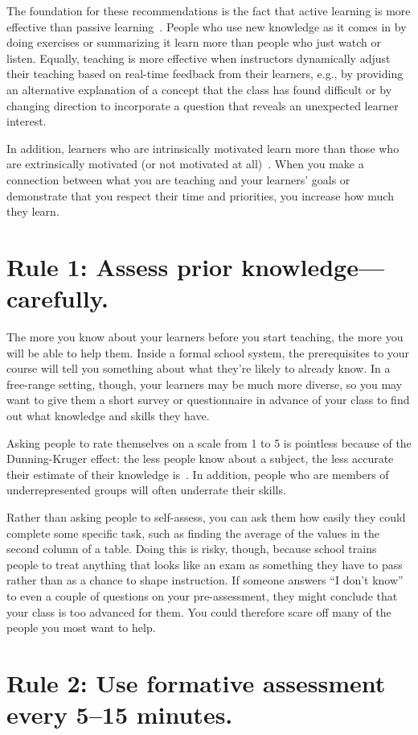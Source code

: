 \documentclass[10pt,letterpaper]{article}
\newcommand{\rulemajor}[1]{\section{#1}}
\begin{document}
The foundation for these recommendations is the fact that
active learning is more effective than passive learning~\cite{Ambr2010,HPL2}.
People who use new knowledge as it comes in by doing exercises or summarizing it
learn more than people who just watch or listen.
Equally,
teaching is more effective when instructors dynamically adjust their teaching
based on real-time feedback from their learners,
e.g.,
by providing an alternative explanation of a concept that the class has found difficult
or by changing direction to incorporate a question that reveals an unexpected learner interest.

In addition,
learners who are intrinsically motivated learn more than those who are extrinsically motivated
(or not motivated at all)~\cite{Wlod2017}.
When you make a connection between what you are teaching and your learners' goals
or demonstrate that you respect their time and priorities,
you increase how much they learn.

\rulemajor{Rule 1: Assess prior knowledge---carefully.}

The more you know about your learners before you start teaching,
the more you will be able to help them.
Inside a formal school system,
the prerequisites to your course will tell you something about
what they're likely to already know.
In a free-range setting,
though,
your learners may be much more diverse,
so you may want to give them a short survey or questionnaire in advance of your class
to find out what knowledge and skills they have.

Asking people to rate themselves on a scale from 1 to 5 is pointless
because of the Dunning-Kruger effect:
the less people know about a subject,
the less accurate their estimate of their knowledge is~\cite{Krug1999}.
In addition,
people who are members of underrepresented groups will often underrate their skills.

Rather than asking people to self-assess,
you can ask them how easily they could complete some specific task,
such as finding the average of the values in the second column of a table.
Doing this is risky,
though,
because school trains people
to treat anything that looks like an exam as something they have to pass
rather than as a chance to shape instruction.
If someone answers ``I don't know'' to even a couple of questions on your pre-assessment,
they might conclude that your class is too advanced for them.
You could therefore scare off many of the people you most want to help.

\rulemajor{Rule 2: Use formative assessment every 5--15 minutes.}
\end{document}
